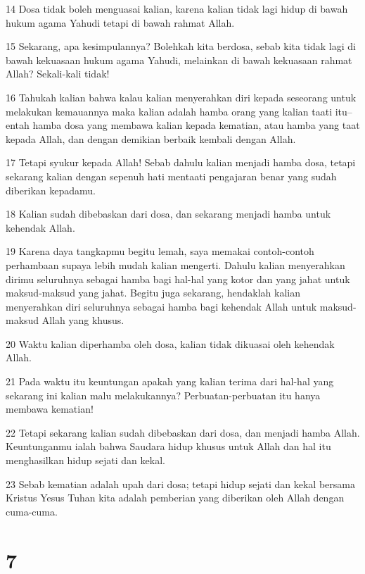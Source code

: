 \par 14 Dosa tidak boleh menguasai kalian, karena kalian tidak lagi hidup di bawah hukum agama Yahudi tetapi di bawah rahmat Allah.
\par 15 Sekarang, apa kesimpulannya? Bolehkah kita berdosa, sebab kita tidak lagi di bawah kekuasaan hukum agama Yahudi, melainkan di bawah kekuasaan rahmat Allah? Sekali-kali tidak!
\par 16 Tahukah kalian bahwa kalau kalian menyerahkan diri kepada seseorang untuk melakukan kemauannya maka kalian adalah hamba orang yang kalian taati itu--entah hamba dosa yang membawa kalian kepada kematian, atau hamba yang taat kepada Allah, dan dengan demikian berbaik kembali dengan Allah.
\par 17 Tetapi syukur kepada Allah! Sebab dahulu kalian menjadi hamba dosa, tetapi sekarang kalian dengan sepenuh hati mentaati pengajaran benar yang sudah diberikan kepadamu.
\par 18 Kalian sudah dibebaskan dari dosa, dan sekarang menjadi hamba untuk kehendak Allah.
\par 19 Karena daya tangkapmu begitu lemah, saya memakai contoh-contoh perhambaan supaya lebih mudah kalian mengerti. Dahulu kalian menyerahkan dirimu seluruhnya sebagai hamba bagi hal-hal yang kotor dan yang jahat untuk maksud-maksud yang jahat. Begitu juga sekarang, hendaklah kalian menyerahkan diri seluruhnya sebagai hamba bagi kehendak Allah untuk maksud-maksud Allah yang khusus.
\par 20 Waktu kalian diperhamba oleh dosa, kalian tidak dikuasai oleh kehendak Allah.
\par 21 Pada waktu itu keuntungan apakah yang kalian terima dari hal-hal yang sekarang ini kalian malu melakukannya? Perbuatan-perbuatan itu hanya membawa kematian!
\par 22 Tetapi sekarang kalian sudah dibebaskan dari dosa, dan menjadi hamba Allah. Keuntunganmu ialah bahwa Saudara hidup khusus untuk Allah dan hal itu menghasilkan hidup sejati dan kekal.
\par 23 Sebab kematian adalah upah dari dosa; tetapi hidup sejati dan kekal bersama Kristus Yesus Tuhan kita adalah pemberian yang diberikan oleh Allah dengan cuma-cuma.

\chapter{7}

